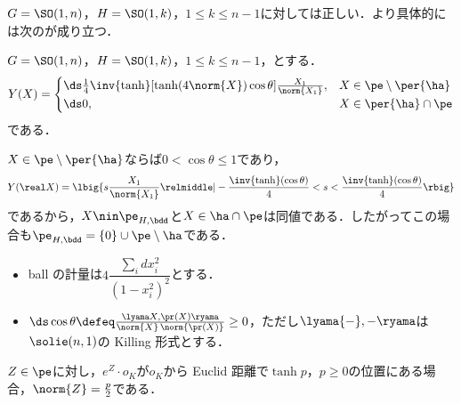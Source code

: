 \begin{cor}\label{cor:prob-eg}
  $G = \SO(1,n) $，$H = \SO(1,k) $，$1\leq k\leq n-1$に対しては正しい．より具体的には次のが成り立つ．
\end{cor}
\begin{prop}\label{thm:1018-main}
  $G = \SO(1,n) $，$H = \SO(1,k) $，$1\leq k\leq n-1$，とする．
  \begin{align*}
    Y(X) =
    \begin{cases}
      \ds  \frac{1}{4}\inv{\tanh}[\tanh(4\norm{X})\cos\theta ]\frac{X_1}{\norm{X_1}}, &X\in \pe\setminus \per{\ha} \\
    \ds  0, &X\in  \per{\ha}\cap \pe
  \end{cases}
  \end{align*}
  である．
\end{prop}
\begin{cor}
  $X\in \pe\setminus\per{\ha}$ならば$0 < \cos \theta \leq 1$であり，
  \begin{align*}
    Y(\real X) = \lbig\{s\frac{X_1}{\norm{X_1}} \relmiddle|  -\frac{\inv{\tanh}(\cos\theta)}{4} < s < \frac{\inv{\tanh}(\cos\theta)}{4} \rbig\}
  \end{align*}
  であるから，$X\nin \pe_{H,\bdd} $と$X\in \ha\cap \pe $は同値である．したがってこの場合も$\pe_{H,\bdd} =\{0\}\cup\pe\setminus\ha $である．
\end{cor}

\begin{defi}
  \leavevmode\vspace{-1em}
  \begin{itemize}
    \item {\Poincare} ball の計量は$4\dfrac{\sum_i dx_i^2}{(1-x_i^2)^2} $とする．
    \item $\ds \cos \theta \defeq \frac{\lyama X, \pr(X)\ryama }{\norm{X}\, \norm{\pr(X)}} \geq 0 $，ただし$\lyama{-},{-}\ryama  $は$\solie(n,1) $の Killing 形式とする．
  \end{itemize} 
\end{defi}

\begin{lem}\label{lem:1018}
  $Z\in \pe$に対し，$e^Z \cdot o_K $が$o_K$から Euclid 距離で$\tanh p$，$p \geq 0$の位置にある場合，$\norm{Z} = \frac{p}{2} $である．
\end{lem}




